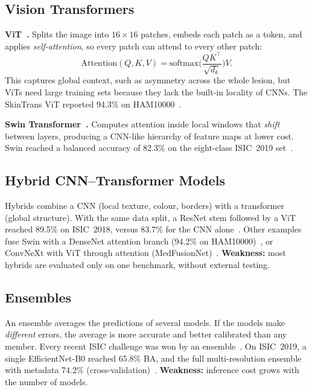 \documentclass[10pt,a4paper]{article}
\begin{document}
\subsection{Vision Transformers}
\textbf{ViT~\cite{dosovitskiy2021vit}.} Splits the image into
$16\times16$ patches, embeds each patch as a token, and applies
\emph{self-attention}, so every patch can attend to every other patch:
\begin{equation}
\mathrm{Attention}(Q,K,V)=\mathrm{softmax}\!\Big(\frac{QK^{\top}}{\sqrt{d_k}}\Big)V .
\end{equation}
This captures global context, such as asymmetry across the whole lesion,
but ViTs need large training sets because they lack the built-in
locality of CNNs. The SkinTrans ViT reported 94.3\% on
HAM10000~\cite{xin2022skintrans}.

\textbf{Swin Transformer~\cite{liu2021swin}.} Computes attention inside
local windows that \emph{shift} between layers, producing a CNN-like
hierarchy of feature maps at lower cost. Swin reached a balanced
accuracy of 82.3\% on the eight-class ISIC~2019 set~\cite{ayas2023swin}.

\subsection{Hybrid CNN--Transformer Models}
Hybrids combine a CNN (local texture, colour, borders) with a
transformer (global structure). With the same data split, a ResNet stem
followed by a ViT reached 89.5\% on ISIC~2018, versus 83.7\% for the CNN
alone~\cite{nie2023hybrid}. Other examples fuse Swin with a DenseNet
attention branch (94.2\% on HAM10000)~\cite{karthik2024}, or ConvNeXt
with ViT through attention (MedFusionNet)~\cite{naeem2025}.
\textbf{Weakness:} most hybrids are evaluated only on one benchmark,
without external testing.

\subsection{Ensembles}
An ensemble averages the predictions of several models. If the models
make \emph{different} errors, the average is more accurate and better
calibrated than any member. Every recent ISIC challenge was won by an
ensemble~\cite{gessert2020,ha2020siim}. On ISIC~2019, a single
EfficientNet-B0 reached 65.8\% BA, and the full multi-resolution
ensemble with metadata 74.2\% (cross-validation)~\cite{gessert2020}.
\textbf{Weakness:} inference cost grows with the number of models.
\end{document}
